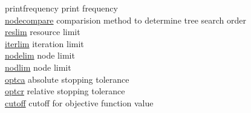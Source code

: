 \begin{tabbing}
{printfrequency} \> print frequency \\
\hyperlink{nodecompare}
{nodecompare} \> comparision method to determine tree search order \\
\hyperlink{reslim}
{reslim} \> resource limit \\
\hyperlink{iterlim}
{iterlim} \> iteration limit \\
\hyperlink{nodelim}
{nodelim} \> node limit \\
\hyperlink{nodlim}
{nodlim} \> node limit \\
\hyperlink{optca}
{optca} \> absolute stopping tolerance \\
\hyperlink{optcr}
{optcr} \> relative stopping tolerance \\
\hyperlink{cutoff}
{cutoff} \> cutoff for objective function value \\
\end{tabbing}

